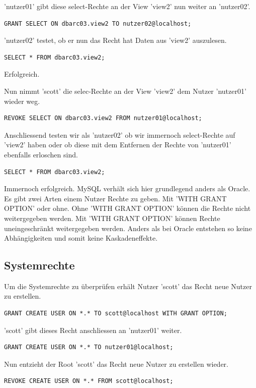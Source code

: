 \documentclass[10pt]{scrreprt}
\begin{document}
'nutzer01' gibt diese select-Rechte an der View 'view2' nun weiter an 'nutzer02'.
\begin{lstlisting}[style=sql]
GRANT SELECT ON dbarc03.view2 TO nutzer02@localhost;
\end{lstlisting}

'nutzer02' testet, ob er nun das Recht hat Daten aus 'view2' auszulesen.
\begin{lstlisting}[style=sql]
SELECT * FROM dbarc03.view2;
\end{lstlisting}
Erfolgreich.

Nun nimmt 'scott' die selec-Rechte an der View 'view2' dem Nutzer 'nutzer01' wieder weg.
\begin{lstlisting}[style=sql]
REVOKE SELECT ON dbarc03.view2 FROM nutzer01@localhost;
\end{lstlisting}

Anschliessend testen wir als 'nutzer02' ob wir immernoch select-Rechte auf 'view2' haben oder ob diese mit dem Entfernen der Rechte von 'nutzer01' ebenfalls erloschen sind. 
\begin{lstlisting}[style=sql]
SELECT * FROM dbarc03.view2;
\end{lstlisting}
Immernoch erfolgreich.
\newline\newline
MySQL verhält sich hier grundlegend anders als Oracle. Es gibt zwei Arten einem Nutzer Rechte zu geben. Mit 'WITH GRANT OPTION' oder ohne.\newline
Ohne 'WITH GRANT OPTION' können die Rechte nicht weitergegeben werden. Mit 'WITH GRANT OPTION' können Rechte uneingeschränkt weitergegeben werden. Anders als bei Oracle entstehen so keine Abhängigkeiten und somit keine Kaskadeneffekte.

\subsection{Systemrechte}
Um die Systemrechte zu überprüfen erhält Nutzer 'scott' das Recht neue Nutzer zu erstellen.
\begin{lstlisting}[style=sql]
GRANT CREATE USER ON *.* TO scott@localhost WITH GRANT OPTION;
\end{lstlisting}

'scott' gibt dieses Recht anschliessen an 'nutzer01' weiter.
\begin{lstlisting}[style=sql]
GRANT CREATE USER ON *.* TO nutzer01@localhost;
\end{lstlisting}

Nun entzieht der Root 'scott' das Recht neue Nutzer zu erstellen wieder.
\begin{lstlisting}[style=sql]
REVOKE CREATE USER ON *.* FROM scott@localhost;
\end{lstlisting}
\end{document}
